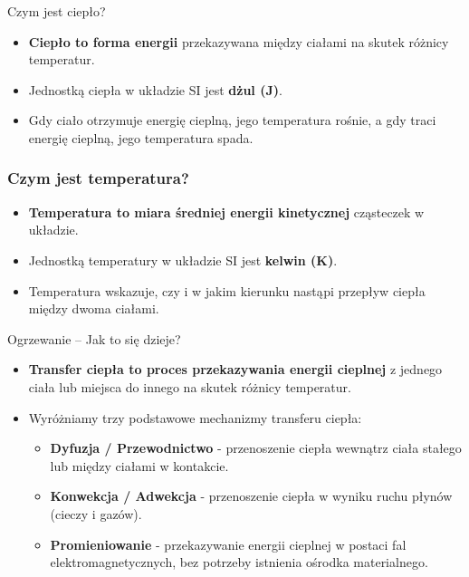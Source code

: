 \documentclass{beamer}
\theoremstyle{break}
\theoremstyle{break}
\theoremstyle{break}
\theoremstyle{break}
\theoremstyle{break}
\begin{document}
\begin{frame}{Czym jest ciepło?}
    
    \begin{itemize}
        \item \textbf{Ciepło to forma energii} przekazywana między ciałami na skutek różnicy temperatur.
        \item Jednostką ciepła w układzie SI jest \textbf{dżul (J)}.
        \item Gdy ciało otrzymuje energię cieplną, jego temperatura rośnie, a gdy traci energię cieplną, jego temperatura spada.
    \end{itemize}
\end{frame}

\begin{frame}
    \frametitle{Czym jest temperatura?}

    \begin{itemize}
        \item \textbf{Temperatura to miara średniej energii kinetycznej} cząsteczek w układzie.
        \item Jednostką temperatury w układzie SI jest \textbf{kelwin (K)}.
        \item Temperatura wskazuje, czy i w jakim kierunku nastąpi przepływ ciepła między dwoma ciałami.
    \end{itemize}
\end{frame}

\begin{frame}{Ogrzewanie -- Jak to się dzieje?}
    
    \begin{itemize}
        \item \textbf{Transfer ciepła to proces przekazywania energii cieplnej} z jednego ciała lub miejsca do innego na skutek różnicy temperatur.
        \item Wyróżniamy trzy podstawowe mechanizmy transferu ciepła:
        \begin{itemize}
            \item \textbf{Dyfuzja / Przewodnictwo} - przenoszenie ciepła wewnątrz ciała stałego lub między ciałami w kontakcie.
            \item \textbf{Konwekcja / Adwekcja} - przenoszenie ciepła w wyniku ruchu płynów (cieczy i gazów).
            \item \textbf{Promieniowanie} - przekazywanie energii cieplnej w postaci fal elektromagnetycznych, bez potrzeby istnienia ośrodka materialnego.
        \end{itemize}
    \end{itemize}
\end{frame}
\end{document}
